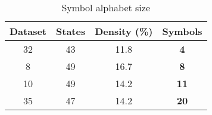 \begin{table}
\centering
{
\begin{tabular}{| c | c | c | c |}
  \hline
  Dataset 	& States	 	& Density (\%) 	& \textbf{Symbols}	 \\  \hline
  32 			& 43				& 11.8				& \textbf{4}		\\
  8 			& 49				& 16.7 				& \textbf{8}		\\
  10			& 49				& 14.2 				& \textbf{11}	\\
  35			& 47				& 14.2 				& \textbf{20}	\\ \hline
\end{tabular}
\caption{Symbol alphabet size}
\label{symbol_table}

}
\end{table}
